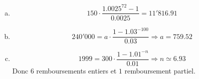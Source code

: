 \documentclass[12pt, addpoints]{exam}
\begin{document}
\begin{questions}
\begin{solution}
\begin{enumerate}[1.]
\begin{enumerate}[(a)]
            \item 
            $$
            150 \cdot \frac{1.0025^{72}-1}{0.0025} = 11'816.91
            $$
            \item
            $$
            240'000=a\cdot \frac{1-1.03^{-100}}{0.03} \Rightarrow a=759.52
            $$
            \item 
            $$
            1999 = 300\cdot \frac{1-1.01^{-n}}{0.01} \Rightarrow n\simeq 6.93
            $$
            Donc $6$ remboursements entiers et $1$ remboursement partiel.
            \end{enumerate}
\end{enumerate}


\end{solution}
\end{questions}
\end{document}
